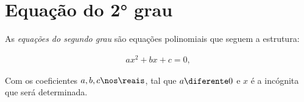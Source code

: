\section{Equação do 2° grau}

As \emph{equações do segundo grau} são equações polinomiais que seguem a estrutura:

\begin{align*}
    ax^2 + bx + c = 0,
\end{align*}

Com os coeficientes $a, b, c \nos \reais$, tal que $a \diferente 0$ e $x$ é a incógnita que será determinada.

